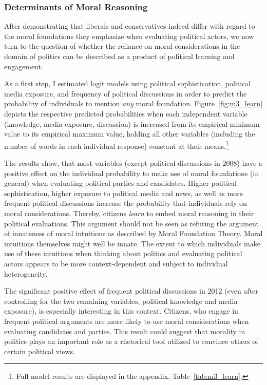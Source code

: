 \documentclass[12pt]{article}
\begin{document}
\subsubsection{Determinants of Moral Reasoning}

After demonstrating that liberals and conservatives indeed differ with regard to the moral foundations they emphasize when evaluating political actors, we now turn to the question of whether the reliance on moral considerations in the domain of politics can be described as a product of political learning and engagement.

As a first step, I estimated logit models using political sophistication, political media exposure, and frequency of political discussions in order to predict the probability of individuals to mention \textit{any} moral foundation. Figure~\ref{fig:m3_learn} depicts the respective predicted probabilities when each independent variable (knowledge, media exposure, discussion) is increased from its empirical minimum value to its empirical maximum value, holding all other variables (including the number of words in each individual response) constant at their means.\footnote{Full model results are displayed in the appendix, Table~\ref{tab:m3_learn}.}

The results show, that most variables (except political discussions in 2008) have a positive effect on the individual probability to make use of moral foundations (in general) when evaluating political parties and candidates. Higher political sophistication, higher exposure to political media and news, as well as more frequent political discussions increase the probability that individuals rely on moral considerations. Thereby, citizens \textit{learn} to embed moral reasoning in their political evaluations. This argument should not be seen as refuting the argument of innateness of moral intuitions as described by Moral Foundation Theory. Moral intuitions themselves might well be innate. The extent to which individuals make use of these intuitions when thinking about politics and evaluating political actors appears to be more context-dependent and subject to individual heterogeneity.

The significant positive effect of frequent political discussions in 2012 (even after controlling for the two remaining variables, political knowledge and media exposure), is especially interesting in this context. Citizens, who engage in frequent political arguments are more likely to use moral considerations when evaluating candidates and parties. This result could suggest that morality in politics plays an important role as a rhetorical tool utilized to convince others of certain political views.
\end{document}
